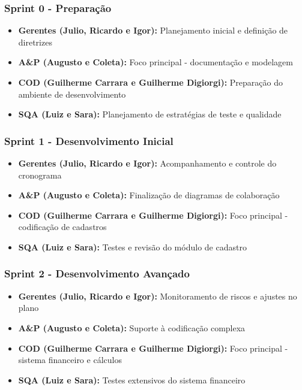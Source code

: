 \subsubsection{Sprint 0 - Preparação}
\begin{itemize}
    \item \textbf{Gerentes (Julio, Ricardo e Igor):} Planejamento inicial e definição de diretrizes
    \item \textbf{A\&P (Augusto e Coleta):} Foco principal - documentação e modelagem
    \item \textbf{COD (Guilherme Carrara e Guilherme Digiorgi):} Preparação do ambiente de desenvolvimento
    \item \textbf{SQA (Luiz e Sara):} Planejamento de estratégias de teste e qualidade
\end{itemize}

\subsubsection{Sprint 1 - Desenvolvimento Inicial}
\begin{itemize}
    \item \textbf{Gerentes (Julio, Ricardo e Igor):} Acompanhamento e controle do cronograma
    \item \textbf{A\&P (Augusto e Coleta):} Finalização de diagramas de colaboração
    \item \textbf{COD (Guilherme Carrara e Guilherme Digiorgi):} Foco principal - codificação de cadastros
    \item \textbf{SQA (Luiz e Sara):} Testes e revisão do módulo de cadastro
\end{itemize}

\subsubsection{Sprint 2 - Desenvolvimento Avançado}
\begin{itemize}
    \item \textbf{Gerentes (Julio, Ricardo e Igor):} Monitoramento de riscos e ajustes no plano
    \item \textbf{A\&P (Augusto e Coleta):} Suporte à codificação complexa
    \item \textbf{COD (Guilherme Carrara e Guilherme Digiorgi):} Foco principal - sistema financeiro e cálculos
    \item \textbf{SQA (Luiz e Sara):} Testes extensivos do sistema financeiro
\end{itemize}

